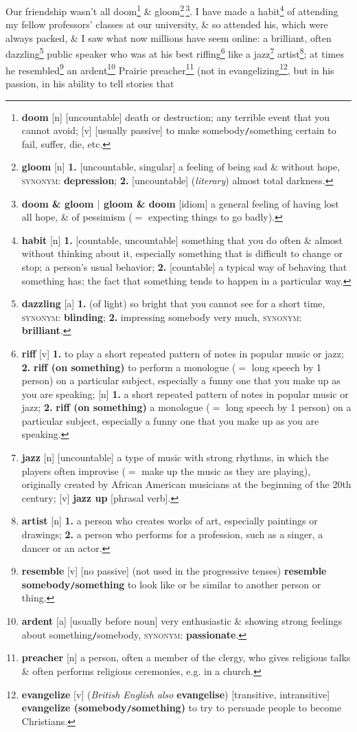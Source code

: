 \documentclass[oneside]{book}
\numberwithin{equation}{section}
\begin{document}
Our friendship wasn't all doom\footnote{\textbf{doom} [n] [uncountable] death or destruction; any terrible event that you cannot avoid; [v] [usually passive] to make somebody\texttt{/}something certain to fail, suffer, die, etc.} \& gloom\footnote{\textbf{gloom} [n] \textbf{1.} [uncountable, singular] a feeling of being sad \& without hope, \textsc{synonym}: \textbf{depression}; \textbf{2.} [uncountable] (\textit{literary}) almost total darkness.}\,\footnote{\textbf{doom \& gloom $|$ gloom \& doom} [idiom] a general feeling of having lost all hope, \& of pessimism ($=$ expecting things to go badly).}. I have made a habit\footnote{\textbf{habit} [n] \textbf{1.} [countable, uncountable] something that you do often \& almost without thinking about it, especially something that is difficult to change or stop; a person's usual behavior; \textbf{2.} [countable] a typical way of behaving that something has; the fact that something tends to happen in a particular way.} of attending my fellow professors' classes at our university, \& so attended his, which were always packed, \& I saw what now millions have seem online: a brilliant, often dazzling\footnote{\textbf{dazzling} [a] \textbf{1.} (of light) so bright that you cannot see for a short time, \textsc{synonym}: \textbf{blinding}; \textbf{2.} impressing somebody very much, \textsc{synonym}: \textbf{brilliant}.} public speaker who was at his best riffing\footnote{\textbf{riff} [v] \textbf{1.} to play a short repeated pattern of notes in popular music or jazz; \textbf{2.} \textbf{riff (on something)} to perform a monologue ($=$ long speech by 1 person) on a particular subject, especially a funny one that you make up as you are speaking; [n] \textbf{1.} a short repeated pattern of notes in popular music or jazz; \textbf{2.} \textbf{riff (on something)} a monologue ($=$ long speech by 1 person) on a particular subject, especially a funny one that you make up as you are speaking.} like a jazz\footnote{\textbf{jazz} [n] [uncountable] a type of music with strong rhythms, in which the players often improvise ($=$ make up the music as they are playing), originally created by African American musicians at the beginning of the 20th century; [v] \textbf{jazz up} [phrasal verb].} artist\footnote{\textbf{artist} [n] \textbf{1.} a person who creates works of art, especially paintings or drawings; \textbf{2.} a person who performs for a profession, such as a singer, a dancer or an actor.}; at times he resembled\footnote{\textbf{resemble} [v] [no passive] (not used in the progressive tenses) \textbf{resemble somebody\texttt{/}something} to look like or be similar to another person or thing.} an ardent\footnote{\textbf{ardent} [a] [usually before noun] very enthusiastic \& showing strong feelings about something\texttt{/}somebody, \textsc{synonym}: \textbf{passionate}.} Prairie preacher\footnote{\textbf{preacher} [n] a person, often a member of the clergy, who gives religious talks \& often performs religious ceremonies, e.g. in a church.} (not in evangelizing\footnote{\textbf{evangelize} [v] (\textit{British English also} \textbf{evangelise}) [transitive, intransitive] \textbf{evangelize (somebody\texttt{/}something)} to try to persuade people to become Christians.}, but in his passion, in his ability to tell stories that 
\end{document}
